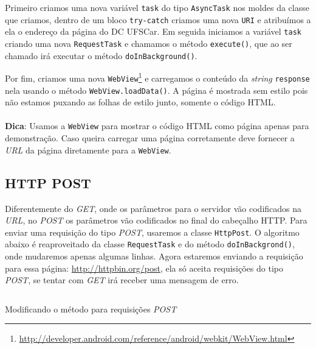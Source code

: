 \documentclass[a4paper,12pt,brazil,oneside]{book}
\begin{document}
		Primeiro criamos uma nova variável \texttt{task} do tipo \texttt{AsyncTask} nos moldes da classe que criamos, dentro de um bloco \texttt{try-catch} criamos uma nova \texttt{URI} e atribuímos a ela o endereço da página do DC UFSCar. Em seguida iniciamos a variável \texttt{task} criando uma nova \texttt{RequestTask} e chamamos o método \texttt{execute()}, que ao ser chamado irá executar o método \texttt{doInBackground()}. 
		
		Por fim, criamos uma nova \texttt{WebView}\footnote{\href{http://developer.android.com/reference/android/webkit/WebView.html}{http://developer.android.com/reference/android/webkit/WebView.html}} e carregamos o conteúdo da \emph{string} \texttt{response} nela usando o método \texttt{WebView.loadData()}. A página é mostrada sem estilo pois não estamos puxando as folhas de estilo junto, somente o código HTML.
		 
		 \begin{framed}
\paragraph{}\textbf{Dica}: Usamos a \texttt{WebView} para mostrar o código HTML como página apenas para demonstração. Caso queira carregar uma página corretamente deve fornecer a \emph{URL} da página diretamente para a \texttt{WebView}.
\textit{}
\end{framed}

		\subsection{HTTP POST}
		Diferentemente do \emph{GET}, onde os parâmetros para o servidor vão codificados na \emph{URL}, no \emph{POST} os parâmetros vão codificados no final do cabeçalho HTTP. Para enviar uma requisição do tipo \emph{POST}, usaremos a classe \texttt{HttpPost}. O algoritmo abaixo é reaproveitado da classe \texttt{RequestTask} e do método \texttt{doInBackgrond()}, onde mudaremos apenas algumas linhas. Agora estaremos enviando a requisição para essa página: \href{http://httpbin.org/post}{http://httpbin.org/post}, ela só aceita requisições do tipo \emph{POST}, se tentar com \emph{GET} irá receber uma mensagem de erro.

		\begin{listing}[H]
		\inputminted[linenos=true,fontsize=\small,frame=lines, framesep=2mm, tabsize=2,numbersep=5pt]{java}{src/api/comm/httppost.java}
		\caption{Modificando o método para requisições \emph{POST}}
		\label{code:httppost}
		\end{listing} 
\end{document}
